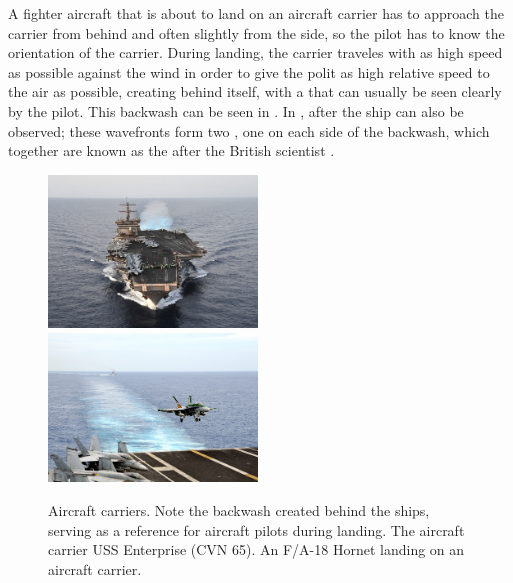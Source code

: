 A fighter aircraft that is about to land on an aircraft carrier has to approach the carrier from behind and often slightly from the side, so the pilot has to know the orientation of the carrier. During landing, the carrier traveles with as high speed as possible against the wind in order to give the polit as high relative speed to the air as possible, creating \wake behind itself, with a \backwash that can usually be seen clearly by the pilot. This backwash can be seen in . In ,  after the ship can also be observed; these wavefronts form two , one on each side of the backwash, which together are known as the  after the British scientist .

\begin{figure}
    \centering
    \subcaptionbox{\label{fig:aircraft_carrier_full_wake}} {\includegraphics[width=0.495\textwidth]{Images/Public_domain/US_Navy_110607-N-JL826-140_The_aircraft_carrier_USS_Enterprise_(CVN_65)_transits_the_Gulf_of_Aden_while_conducting_maritime_security_operations_in_}}
    \subcaptionbox{\label{fig:aircraft_carrier_landing_backwash}} {\includegraphics[width=0.495\textwidth]{Images/Public_domain/US_Navy_091113-N-6567V-068_F-A-18C_Hornet_lands_on_the_aircraft_carrier_USS_George_Washington_(CVN_73)}}
    \caption{Aircraft carriers. Note the backwash created behind the ships, serving as a reference for aircraft pilots during landing.  The aircraft carrier USS Enterprise (CVN 65).  An F/A-18 Hornet landing on an aircraft carrier.}
    \label{fig:aircraft_carriers_and_backwash}
\end{figure}

